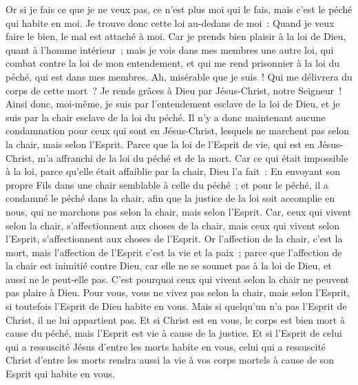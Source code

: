 \begin{multicols}{2}
Or si je fais ce que je ne veux pas, ce n'est plus moi qui le fais, mais c'est le péché qui habite en moi.
Je trouve donc cette loi au-dedans de moi~: Quand je veux faire le bien, le mal est attaché à moi.
Car je prends bien plaisir à la loi de Dieu, quant à l'homme intérieur~;
mais je vois dans mes membres une autre loi, qui combat contre la loi de mon entendement, et qui me rend prisonnier à la loi du péché, qui est dans mes membres.
Ah, misérable que je suis~! Qui me délivrera du corps de cette mort~?
Je rends grâces à Dieu par Jésus-Christ, notre Seigneur~! Ainsi donc, moi-même, je suis par l'entendement esclave de la loi de Dieu, et je suis par la chair esclave de la loi du péché.
\VerseOne{}Il n'y a donc maintenant aucune condamnation pour ceux qui sont en Jésus-Christ, lesquels ne marchent pas selon la chair, mais selon l'Esprit.
Parce que la loi de l'Esprit de vie, qui est en Jésus-Christ, m'a affranchi de la loi du péché et de la mort.
Car ce qui était impossible à la loi, parce qu'elle était affaiblie par la chair, Dieu l'a fait~: En envoyant son propre Fils dans une chair semblable à celle du péché~; et pour le péché, il a condamné le péché dans la chair,
afin que la justice de la loi soit accomplie en nous, qui ne marchons pas selon la chair, mais selon l'Esprit.
Car, ceux qui vivent selon la chair, s'affectionnent aux choses de la chair, mais ceux qui vivent selon l'Esprit, s'affectionnent aux choses de l'Esprit.
Or l'affection de la chair, c'est la mort, mais l'affection de l'Esprit c'est la vie et la paix~;
parce que l'affection de la chair est inimitié contre Dieu, car elle ne se soumet pas à la loi de Dieu, et aussi ne le peut-elle pas.
C'est pourquoi ceux qui vivent selon la chair ne peuvent pas plaire à Dieu.
Pour vous, vous ne vivez pas selon la chair, mais selon l'Esprit, si toutefois l'Esprit de Dieu habite en vous. Mais si quelqu'un n'a pas l'Esprit de Christ, il ne lui appartient pas.
Et si Christ est en vous, le corps est bien mort à cause du péché, mais l'Esprit est vie à cause de la justice.
Et si l'Esprit de celui qui a ressuscité Jésus d'entre les morts habite en vous, celui qui a ressuscité Christ d'entre les morts rendra aussi la vie à vos corps mortels à cause de son Esprit qui habite en vous.

\end{multicols}
